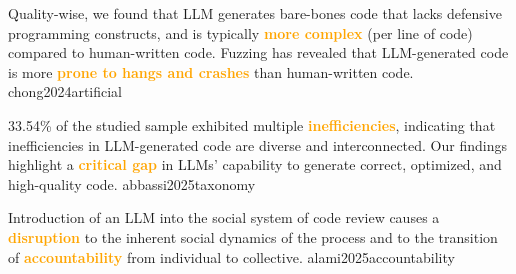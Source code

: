 \documentclass{article}
\newcommand\hlt[1]{\textcolor{orange}{\textbf{#1}}}
\begin{document}


  {Quality-wise, we found that LLM generates bare-bones code that lacks defensive programming constructs, and is typically \hlt{more complex} (per line of code) compared to human-written code. Fuzzing has revealed that LLM-generated code is more \hlt{prone to hangs and crashes} than human-written code.}
  {chong2024artificial}

  {33.54\% of the studied sample exhibited multiple \hlt{inefficiencies}, indicating that inefficiencies in LLM-generated code are diverse and interconnected. Our findings highlight a \hlt{critical gap} in LLMs' capability to generate correct, optimized, and high-quality code.}
  {abbassi2025taxonomy}









  {Introduction of an LLM into the social system of code review causes a \hlt{disruption} to the inherent social dynamics of the process and to the transition of \hlt{accountability} from individual to collective.}
  {alami2025accountability}

\end{document}

